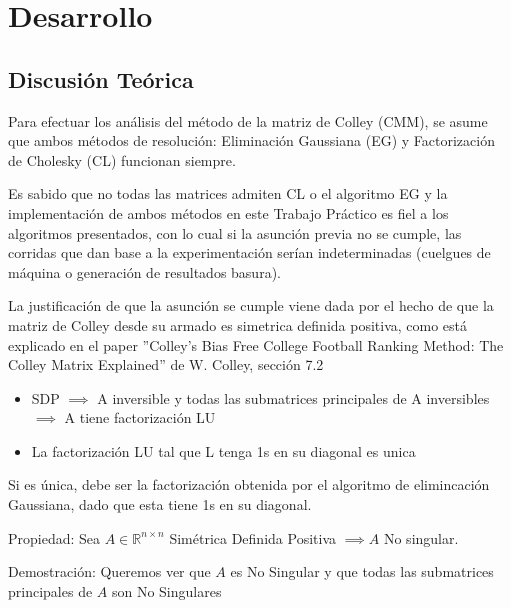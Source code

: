 \section{Desarrollo}

\subsection{Discusión Teórica}

Para efectuar los análisis del método de la matriz de Colley (CMM), se asume que ambos métodos de resolución: Eliminación Gaussiana (EG) y Factorización de Cholesky (CL) funcionan siempre. 

Es sabido que no todas las matrices admiten CL o el algoritmo EG y la implementación de ambos métodos en este Trabajo Práctico es fiel a los algoritmos presentados, con lo cual si la asunción previa no se cumple, las corridas que dan base a la experimentación serían indeterminadas (cuelgues de máquina o generación de resultados basura).

La justificación de que la asunción se cumple viene dada por el hecho de que la matriz de Colley desde su armado es simetrica definida positiva, como está explicado en el paper ''Colley's Bias Free College Football Ranking Method: The Colley Matrix Explained''  de W. Colley, sección 7.2

\begin{itemize}

\item SDP $\implies$ A inversible y todas las submatrices principales de A inversibles $\implies$ A tiene factorización LU

\item La factorización LU tal que L tenga 1s en su diagonal es unica

\end{itemize}

Si es única, debe ser la factorización obtenida por el algoritmo de elimincación Gaussiana, dado que esta tiene 1s en su diagonal.

Propiedad: Sea \(A \in \mathbb{R}^{n \times n}\) Simétrica Definida Positiva \(\implies A\) No singular.

Demostración: Queremos ver que $A$ es No Singular y que todas las submatrices principales de $A$ son No Singulares

